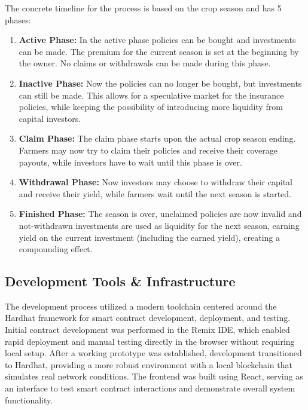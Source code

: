 \documentclass[11pt,a4paper]{article}
\begin{document}
		The concrete timeline for the process is based on the crop season and has 5 phases:
		\begin{enumerate}
			\item \textbf{Active Phase:} In the active phase policies can be bought and investments can be made.
				The premium for the current season is set at the beginning by the owner.
				No claims or withdrawals can be made during this phase.
			\item \textbf{Inactive Phase:} Now the policies can no longer be bought, but investments can still be made.
				This allows for a speculative market for the insurance policies, while keeping the possibility of introducing more liquidity from capital investors.
			\item \textbf{Claim Phase:} The claim phase starts upon the actual crop season ending.
				Farmers may now try to claim their policies and receive their coverage payouts, while investors have to wait until this phase is over.
			\item \textbf{Withdrawal Phase:} Now investors may choose to withdraw their capital and receive their yield, while farmers wait until the next season is started.
			\item \textbf{Finished Phase:} The season is over, unclaimed policies are now invalid and not-withdrawn investments are used as liquidity for the next season, earning yield on the current investment (including the earned yield), creating a compounding effect.
				\label{enum:phases}
		\end{enumerate}

        \subsection{Development Tools \& Infrastructure}\label{subsec:development-tools-infrastructure}
        The development process utilized a modern toolchain centered around the Hardhat framework for smart contract development, deployment, and testing.
        Initial contract development was performed in the Remix IDE, which enabled rapid deployment and manual testing directly in the browser without requiring local setup.
        After a working prototype was established, development transitioned to Hardhat, providing a more robust environment with a local blockchain that simulates real network conditions.
        The frontend was built using React, serving as an interface to test smart contract interactions and demonstrate overall system functionality.
\end{document}
